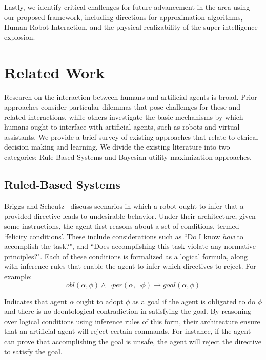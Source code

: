 \documentclass[11pt]{article}
\begin{document}
Lastly, we identify critical challenges for future advancement in the area using our proposed framework, including directions for approximation algorithms, Human-Robot Interaction, and the physical realizability of the super intelligence explosion.


\section{Related Work}

Research on the interaction between humans and artificial agents is broad. Prior approaches consider particular dilemmas that pose challenges for these and related interactions, while others investigate the basic mechanisms by which humans ought to interface with artificial agents, such as robots and virtual assistants. We provide a brief survey of existing approaches that relate to ethical decision making and learning. We divide the existing literature into two categories: Rule-Based Systems
and Bayesian utility maximization approaches.


\subsection{Ruled-Based Systems}

Briggs and Scheutz~ discuss scenarios in which a robot ought to infer that a provided directive leads to undesirable behavior. Under their architecture, given some instructions, the agent first reasons about a set of conditions, termed `felicity conditions'. These include considerations such as ``Do I know {\it how} to accomplish the task?", and ``Does accomplishing this task violate any normative principles?". Each of these conditions is formalized as a logical formula, along with inference rules that enable the agent to infer which directives to reject. For example:
\begin{equation}
obl(\alpha,\phi) \wedge \neg per(\alpha, \neg\phi) \rightarrow goal(\alpha, \phi)
\end{equation}

\noindent Indicates that agent $\alpha$ ought to adopt $\phi$ as a goal if the agent is obligated to do $\phi$ and there is no deontological contradiction in satisfying the goal. By reasoning over logical conditions using inference rules of this form, their architecture ensure that an artificial agent will reject certain commands. For instance, if the agent can prove that accomplishing the goal is unsafe, the agent will reject the directive to satisfy the goal.
\end{document}
